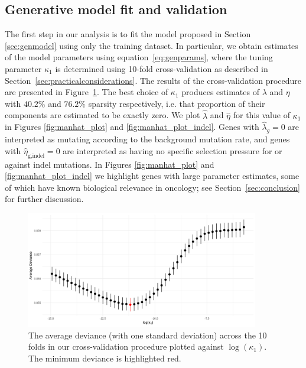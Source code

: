 \documentclass[12pt]{article}
\begin{document}
\subsection{Generative model fit and validation \label{sec:genmodelfit}}
The first step in our analysis is to fit the model proposed in Section \ref{sec:genmodel} using only the training dataset. In particular, we obtain estimates of the model parameters using equation~\eqref{eq:genparams}, where the tuning parameter $\kappa_1$ is determined using 10-fold cross-validation as described in Section~\ref{sec:practicalconsiderations}.  The results of the cross-validation procedure are presented in Figure~\ref{fig:genmodelstats}. The best choice of $\kappa_1$ produces estimates of $\lambda$ and $\eta$ with $40.2\%$ and $76.2\%$ sparsity respectively, i.e. that proportion of their components are estimated to be exactly zero. We plot $\hat{\lambda}$ and $\hat{\eta}$ for this value of $\kappa_1$ in Figures \ref{fig:manhat_plot} and \ref{fig:manhat_plot_indel}. Genes with $\hat{\lambda}_g = 0$ are interpreted as mutating according to the background mutation rate, and genes with $\hat{\eta}_{\text{g,indel}} = 0$ are interpreted as having no specific selection pressure for or against indel mutations. In Figures \ref{fig:manhat_plot} and \ref{fig:manhat_plot_indel} we highlight genes with large parameter estimates, some of which have known biological relevance in oncology; see Section~\ref{sec:conclusion} for further discussion.   
\begin{figure}[htbp]
\centering
\vspace*{-5mm}
\includegraphics[width=4in]{GenModelCV.png}
\vspace*{0mm}
\caption{The average deviance (with one standard deviation) across the 10 folds in our cross-validation procedure plotted against $\log(\kappa_1)$. The minimum deviance is highlighted red.\label{fig:genmodelstats}}
\vspace*{-2mm}
\end{figure}
\end{document}
